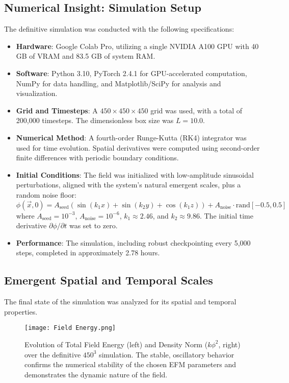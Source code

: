 \documentclass[11pt]{article}
\begin{document}
\subsection{Numerical Insight: Simulation Setup}
The definitive simulation was conducted with the following specifications:
\begin{itemize}
    \item \textbf{Hardware}: Google Colab Pro, utilizing a single NVIDIA A100 GPU with 40 GB of VRAM and 83.5 GB of system RAM.
    \item \textbf{Software}: Python 3.10, PyTorch 2.4.1 for GPU-accelerated computation, NumPy for data handling, and Matplotlib/SciPy for analysis and visualization.
    \item \textbf{Grid and Timesteps}: A \(450 \times 450 \times 450\) grid was used, with a total of 200,000 timesteps. The dimensionless box size was \(L=10.0\).
    \item \textbf{Numerical Method}: A fourth-order Runge-Kutta (RK4) integrator was used for time evolution. Spatial derivatives were computed using second-order finite differences with periodic boundary conditions.
    \item \textbf{Initial Conditions}: The field was initialized with low-amplitude sinusoidal perturbations, aligned with the system's natural emergent scales, plus a random noise floor:
    \begin{equation}
    \phi(\vec{x}, 0) = A_{\text{seed}} \left( \sin(k_1 x) + \sin(k_2 y) + \cos(k_1 z) \right) + A_{\text{noise}} \cdot \text{rand}[-0.5, 0.5]
    \end{equation}
    where \(A_{\text{seed}}=10^{-3}\), \(A_{\text{noise}}=10^{-6}\), \(k_1 \approx 2.46\), and \(k_2 \approx 9.86\). The initial time derivative \(\partial\phi/\partial t\) was set to zero.
    \item \textbf{Performance}: The simulation, including robust checkpointing every 5,000 steps, completed in approximately 2.78 hours.
\end{itemize}

\subsection{Emergent Spatial and Temporal Scales}
The final state of the simulation was analyzed for its spatial and temporal properties.

\begin{figure}[htbp]
\centering
\texttt{[image: Field Energy.png]} %
\caption{Evolution of Total Field Energy (left) and Density Norm (\(k\phi^2\), right) over the definitive \(450^3\) simulation. The stable, oscillatory behavior confirms the numerical stability of the chosen EFM parameters and demonstrates the dynamic nature of the field.}
\label{fig:energy_evolution}
\end{figure}
\end{document}
